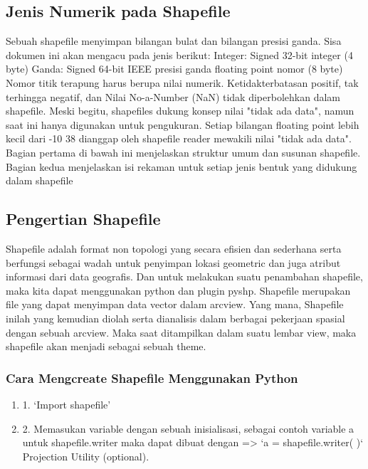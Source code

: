 \subsection{Jenis Numerik pada Shapefile}
Sebuah shapefile menyimpan bilangan bulat dan bilangan presisi ganda. Sisa dokumen ini 
akan mengacu pada jenis berikut: 
Integer: Signed 32-bit integer (4 byte) 
Ganda: Signed 64-bit IEEE presisi ganda floating point nomor (8 byte) 
Nomor titik terapung harus berupa nilai numerik. Ketidakterbatasan positif, tak terhingga negatif, dan 
Nilai No-a-Number (NaN) tidak diperbolehkan dalam shapefile. Meski begitu, shapefiles 
dukung konsep nilai "tidak ada data", namun saat ini hanya digunakan untuk pengukuran. 
Setiap bilangan floating point lebih kecil dari -10 38 dianggap oleh shapefile reader 
mewakili nilai "tidak ada data". 
Bagian pertama di bawah ini menjelaskan struktur umum dan susunan shapefile. 
Bagian kedua menjelaskan isi rekaman untuk setiap jenis bentuk yang didukung dalam 
shapefile 

\subsection{Pengertian Shapefile}
	Shapefile adalah format non topologi yang secara efisien dan sederhana serta berfungsi sebagai wadah untuk penyimpan lokasi geometric dan juga atribut informasi dari data geografis. Dan untuk melakukan suatu penambahan shapefile, maka kita dapat menggunakan python dan plugin pyshp. Shapefile merupakan file yang dapat menyimpan data vector dalam arcview. Yang mana, Shapefile inilah yang kemudian diolah serta dianalisis dalam berbagai pekerjaan spasial dengan sebuah arcview. Maka saat ditampilkan dalam suatu lembar view, maka shapefile  akan menjadi sebagai sebuah theme.

\subsubsection{Cara Mengcreate Shapefile Menggunakan Python}
\begin{enumerate}
    \item 1. ‘Import shapefile’
    \item 2. Memasukan variable dengan sebuah inisialisasi, sebagai contoh variable a untuk    shapefile.writer maka dapat dibuat                    dengan => ‘a = shapefile.writer( )‘
Projection Utility (optional).
\end{enumerate}

